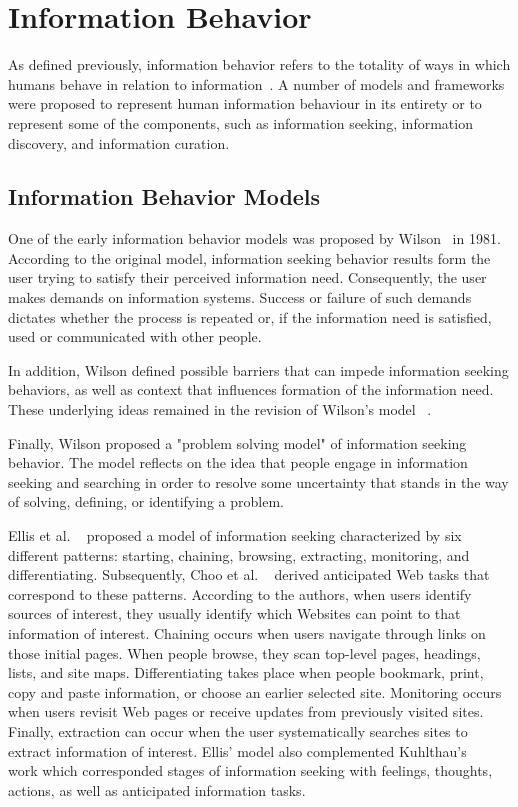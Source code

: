 {\section{Information Behavior}
As defined previously, information behavior refers to the totality of ways in which humans behave in relation to information~\cite{wilson2000human}.  A number of models and frameworks were proposed to represent human information behaviour in its entirety or to represent some of the components, such as information seeking, information discovery, and information curation. 


{\subsection{Information Behavior Models}
One of the early information behavior models was proposed by Wilson~\cite{wilson1981user} in 1981. According to the original model, information seeking behavior results form the user trying to satisfy their perceived information need. Consequently, the user makes demands on information systems. Success or failure of such demands dictates whether the process is repeated or, if the information need is satisfied, used or communicated with other people. 

In addition, Wilson defined possible barriers that can impede information seeking behaviors, as well as context that influences formation of the information need. These underlying ideas remained in the revision of Wilson's model ~\cite{wilson1997}.

Finally, Wilson proposed a "problem solving model" of information seeking behavior. The model reflects on the idea that people engage in information seeking and searching in order to resolve some uncertainty that stands in the way of solving, defining, or identifying a problem.    

} %

Ellis et al. ~\cite{ellis1989, ellis1997, ellis1993} proposed a model of information seeking characterized by six different patterns: starting, chaining, browsing, extracting, monitoring, and differentiating. Subsequently, Choo et al. ~\cite{choo} derived anticipated Web tasks that correspond to these patterns. According to the authors, when users identify sources of interest, they usually identify which Websites can point to that information of interest.  Chaining occurs when users navigate through links on those initial pages. When people browse, they scan top-level pages, headings, lists, and site maps. Differentiating takes place when people bookmark, print, copy and paste information, or choose an earlier selected site. Monitoring occurs when users revisit Web pages or receive updates from previously visited sites. Finally, extraction can occur when the user systematically searches sites to extract information of interest. Ellis' model also complemented Kuhlthau's ~\cite{kuhlthau} work which corresponded stages of information seeking with feelings, thoughts, actions, as well as anticipated information tasks.

}
